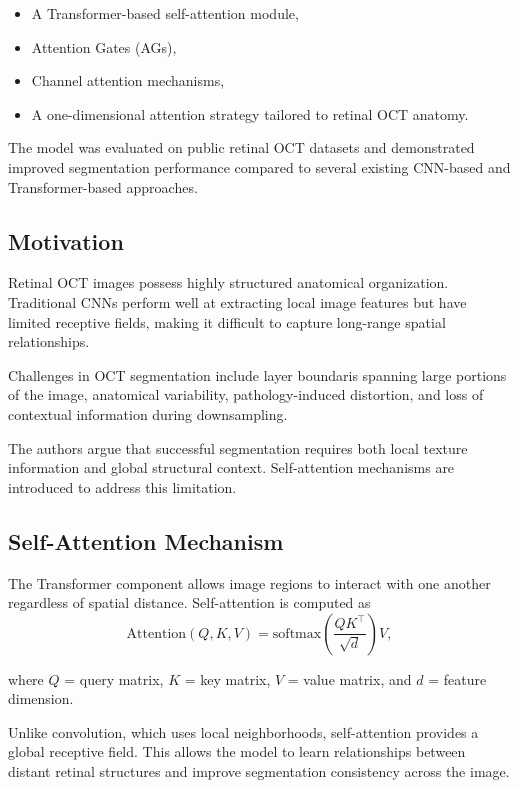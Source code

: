 \documentclass[11pt]{article}
\begin{document}
\begin{itemize}
    \item A Transformer-based self-attention module,
    \item Attention Gates (AGs),
    \item Channel attention mechanisms,
    \item A one-dimensional attention strategy tailored to retinal OCT anatomy.
\end{itemize}

The model was evaluated on public retinal OCT datasets and demonstrated improved segmentation performance compared to several existing CNN-based and Transformer-based approaches.

\subsection*{Motivation}

Retinal OCT images possess highly structured anatomical organization.
Traditional CNNs perform well at extracting local image features but have limited receptive fields, making it difficult to capture long-range spatial relationships.

Challenges in OCT segmentation include layer boundaris spanning large portions of the image, anatomical variability, pathology-induced distortion, and loss of contextual information during downsampling.

The authors argue that successful segmentation requires both local texture information and global structural context.
Self-attention mechanisms are introduced to address this limitation.

\subsection*{Self-Attention Mechanism}

The Transformer component allows image regions to interact with one another regardless of spatial distance.
Self-attention is computed as
\[\text{Attention}(Q,K,V)=\text{softmax}\left(\frac{QK^\top}{\sqrt d}\right)V,\]

where $Q$ = query matrix, $K$ = key matrix, $V$ = value matrix, and $d$ = feature dimension.

Unlike convolution, which uses local neighborhoods, self-attention provides a global receptive field.
This allows the model to learn relationships between distant retinal structures and improve segmentation consistency across the image.
\end{document}
